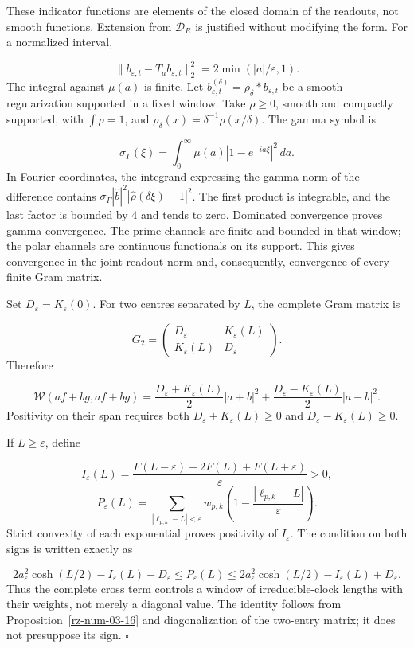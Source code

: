 These indicator functions are elements of the closed domain of the readouts, not smooth functions. Extension from \(\mathcal D_R\) is justified without modifying the form. For a normalized interval,

\[
\|b_{\varepsilon,t}-T_ab_{\varepsilon,t}\|_2^2
=2\min(|a|/\varepsilon,1).
\]
The integral against \(\mu(a)\) is finite. Let \(b_{\varepsilon,t}^{(\delta)}=\rho_\delta*b_{\varepsilon,t}\) be a smooth regularization supported in a fixed window. Take \(\rho\geq0\), smooth and compactly supported, with \(\int\rho=1\), and \(\rho_\delta(x)=\delta^{-1}\rho(x/\delta)\). The gamma symbol is

\[
\sigma_\Gamma(\xi)=\int_0^\infty
\mu(a)|1-e^{-ia\xi}|^2\,da.
\]
In Fourier coordinates, the integrand expressing the gamma norm of the difference contains \(\sigma_\Gamma|\widehat b|^2 |\widehat\rho(\delta\xi)-1|^2\). The first product is integrable, and the last factor is bounded by \(4\) and tends to zero. Dominated convergence proves gamma convergence. The prime channels are finite and bounded in that window; the polar channels are continuous functionals on its support. This gives convergence in the joint readout norm and, consequently, convergence of every finite Gram matrix.

Set \(D_\varepsilon=K_\varepsilon(0)\). For two centres separated by \(L\), the complete Gram matrix is

\[
G_2=\begin{pmatrix}D_\varepsilon&K_\varepsilon(L)\\
K_\varepsilon(L)&D_\varepsilon\end{pmatrix}.
\]
Therefore

\[
\mathscr W(af+bg,af+bg)=
\frac{D_\varepsilon+K_\varepsilon(L)}2|a+b|^2
+\frac{D_\varepsilon-K_\varepsilon(L)}2|a-b|^2.
\]
Positivity on their span requires both \(D_\varepsilon+K_\varepsilon(L)\geq0\) and \(D_\varepsilon-K_\varepsilon(L)\geq0\).

If \(L\geq\varepsilon\), define

\[
I_\varepsilon(L)=
\frac{F(L-\varepsilon)-2F(L)+F(L+\varepsilon)}{\varepsilon}>0,
\]
\[
P_\varepsilon(L)=
\sum_{|\ell_{p,k}-L|<\varepsilon}w_{p,k}
\left(1-\frac{|\ell_{p,k}-L|}{\varepsilon}\right).
\]
Strict convexity of each exponential proves positivity of \(I_\varepsilon\). The condition on both signs is written exactly as

\[
2a_\varepsilon^2\cosh(L/2)-I_\varepsilon(L)-D_\varepsilon
\leq P_\varepsilon(L)
\leq
2a_\varepsilon^2\cosh(L/2)-I_\varepsilon(L)+D_\varepsilon.
\]
Thus the complete cross term controls a window of irreducible-clock lengths with their weights, not merely a diagonal value. The identity follows from Proposition~\ref{rz-num-03-16} and diagonalization of the two-entry matrix; it does not presuppose its sign. \hfill\(\square\)

